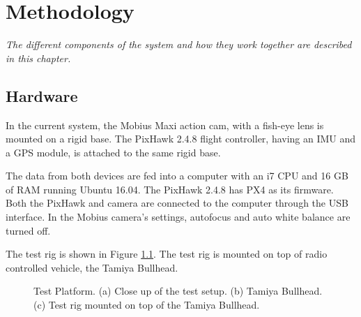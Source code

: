 \setlength{\footskip}{8mm}

\chapter{Methodology}
\label{ch:methodology}

\textit{The different components of the system and how they work together are described in this chapter.}

\section{Hardware}

In the current system, the Mobius Maxi action cam, with a fish-eye lens is mounted on a rigid base. The PixHawk 2.4.8 flight controller, having an IMU and a GPS module, is attached to the same rigid base. 


The data from both devices are fed into a computer with an i7 CPU and 16 GB of RAM running Ubuntu 16.04. The PixHawk 2.4.8 has PX4 as its firmware. Both the PixHawk and camera are connected to the computer through the USB interface. In the Mobius camera's settings, autofocus and auto white balance are turned off. 

The test rig is shown in Figure \ref{fig:rigsetup}. The test rig is mounted on top of radio controlled vehicle, the Tamiya Bullhead. 

\begin{figure}[htp]
	
	\centering
	\caption[Test platform.]{\small 
		Test Platform. (a) Close up of the test setup. (b) Tamiya Bullhead. (c) Test rig mounted on top of the Tamiya Bullhead.}
	\label{fig:rigsetup}
	
\end{figure}


